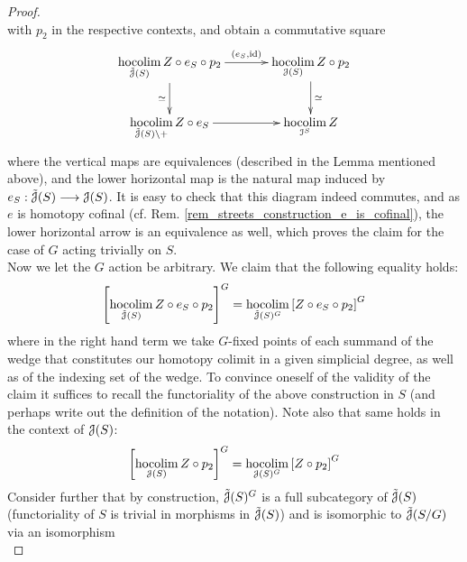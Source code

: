 \begin{lem}
\begin{proof}
\begin{displaymath}
      \end{displaymath}
      with $p_2$ in the respective contexts, and obtain a commutative square
      \begin{displaymath}
        \xymatrix@C+1em{
          \hocolim\limits_{\tilde{\cJ}(S)} Z \circ e_S \circ p_2
            \ar[r]^-{(e_S, \id)}
            \ar[d]_-{\simeq}
          &
          \hocolim\limits_{\cJ(S)} Z \circ p_2
            \ar[d]^-{\simeq}
          \\
          \hocolim\limits_{\tilde{\cJ}(S) \setminus {+}} Z \circ e_S
            \ar[r]
          &
          \hocolim\limits_{\cI^S} Z
        }
      \end{displaymath}
      where the vertical maps are equivalences (described in the Lemma
      mentioned above), and the lower horizontal map is the natural map induced
      by $e_S: \tilde{\mathcal{J}}(S) \longrightarrow \mathcal{J}(S)$. It is easy to check that this
      diagram indeed commutes, and as $e$ is homotopy cofinal (cf. Rem.
      \ref{rem_streets_construction_e_is_cofinal}), the lower horizontal arrow
      is an equivalence as well, which proves the claim for the case of $G$
      acting trivially on $S$.\\
      Now we let the $G$ action be arbitrary. We claim that the following
      equality holds:
      \begin{displaymath}
        \left[ \hocolim_{\tilde{\cJ}(S)} Z \circ e_S \circ p_2 \right]^G = %
        \hocolim_{\tilde{\cJ}(S)^G} \left[ Z \circ e_S \circ p_2 \right]^G
      \end{displaymath}
      where in the right hand term we take $G$-fixed points of each summand
      of the wedge that constitutes our homotopy colimit in a given simplicial
      degree, as well as of the indexing set of the wedge. To convince oneself
      of the validity of the claim it suffices to recall the functoriality of
      the above construction in $S$ (and perhaps write out the definition of the
      notation). Note also that same holds in the context of $\mathcal{J}(S)$:
      \begin{displaymath}
        \left[ \hocolim_{\cJ(S)} Z \circ p_2 \right]^G = %
        \hocolim_{\cJ(S)^G} \left[ Z \circ p_2 \right]^G
      \end{displaymath}
      Consider further that by construction, $\tilde{\mathcal{J}}(S)^G$ is a full
      subcategory of $\tilde{\mathcal{J}}(S)$ (functoriality of $S$ is trivial in
      morphisms in $\tilde{\mathcal{J}}(S)$) and is isomorphic to $\tilde{\mathcal{J}}(S/G)$
      via an isomorphism 
      \begin{displaymath}

\end{displaymath}
\end{proof}
\end{lem}
